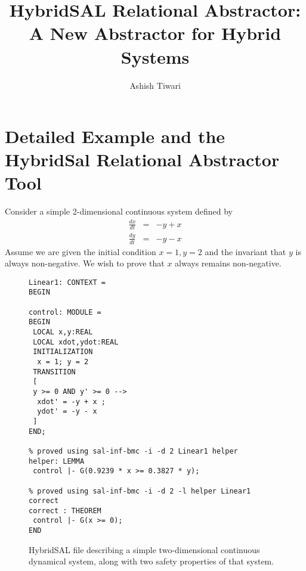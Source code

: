 \documentclass{article}
\begin{document}
\title{HybridSAL Relational Abstractor: A New Abstractor for Hybrid Systems}
\author{Ashish Tiwari}

\maketitle

\section{Detailed Example and the HybridSal Relational Abstractor Tool}

Consider a simple 2-dimensional continuous system defined by
\begin{eqnarray*}
\frac{dx}{dt} & = & -y + x
\\
\frac{dy}{dt} & = & -y - x
\end{eqnarray*}
Assume we are given the initial condition $x = 1, y = 2$
and the invariant that $y$ is always non-negative.
We wish to prove that $x$ always remains non-negative.

\begin{figure}[t]
\begin{tt}
\begin{verbatim}
Linear1: CONTEXT = 
BEGIN

control: MODULE =
BEGIN
 LOCAL x,y:REAL
 LOCAL xdot,ydot:REAL
 INITIALIZATION
  x = 1; y = 2
 TRANSITION
 [
 y >= 0 AND y' >= 0 --> 
  xdot' = -y + x ;
  ydot' = -y - x
 ]
END;

% proved using sal-inf-bmc -i -d 2 Linear1 helper
helper: LEMMA
 control |- G(0.9239 * x >= 0.3827 * y);

% proved using sal-inf-bmc -i -d 2 -l helper Linear1 correct
correct : THEOREM
 control |- G(x >= 0);
END
\end{verbatim}
\end{tt}
\caption{HybridSAL file describing a simple two-dimensional
continuous dynamical system, along with two safety
properties of that system.}\label{fig:hsal-ex}
\end{figure}
\end{document}
